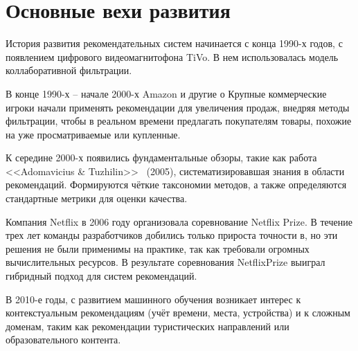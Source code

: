 \section{Основные вехи развития}

История развития рекомендательных систем начинается с конца
1990-х годов, с появлением цифрового видеомагнитофона TiVo. В нем
использовалась модель коллаборативной фильтрации.

В конце 1990-х -- начале 2000-х Amazon и другие о Крупные коммерческие игроки начали применять
рекомендации для увеличения продаж, внедряя методы фильтрации, чтобы в реальном времени предлагать покупателям
товары, похожие на уже просматриваемые или купленные.

К середине 2000-х появились фундаментальные обзоры, такие как работа <<Adomavicius \& Tuzhilin>>~\cite{hist} (2005),
систематизировавшая знания в области рекомендаций. Формируются чёткие таксономии методов,
а также определяются стандартные метрики для оценки качества.

Компания Netflix в 2006 году организовала соревнование
Netflix Prize. В течение трех лет команды разработчиков добились
только прироста точности в, но эти решения не были применимы
на практике, так как требовали огромных вычислительных ресурсов.
В результате соревнования NetflixPrize выиграл гибридный
подход для систем рекомендаций.

В 2010-е годы, с развитием машинного обучения возникает интерес к контекстуальным
рекомендациям (учёт времени, места, устройства) и к сложным доменам, таким как рекомендации
туристических направлений или образовательного контента.

